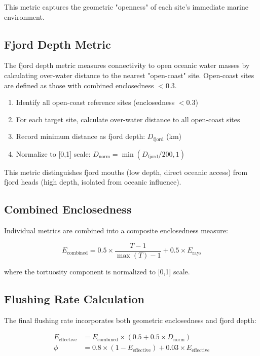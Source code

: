 \documentclass[11pt,a4paper]{article}
\begin{document}
This metric captures the geometric "openness" of each site's immediate marine environment.

\subsection{Fjord Depth Metric}

The fjord depth metric measures connectivity to open oceanic water masses by calculating over-water distance to the nearest "open-coast" site. Open-coast sites are defined as those with combined enclosedness $< 0.3$.

\begin{enumerate}
    \item Identify all open-coast reference sites (enclosedness $< 0.3$)
    \item For each target site, calculate over-water distance to all open-coast sites
    \item Record minimum distance as fjord depth: $D_{\text{fjord}}$ (km)
    \item Normalize to [0,1] scale: $D_{\text{norm}} = \min(D_{\text{fjord}}/200, 1)$
\end{enumerate}

This metric distinguishes fjord mouths (low depth, direct oceanic access) from fjord heads (high depth, isolated from oceanic influence).

\subsection{Combined Enclosedness}

Individual metrics are combined into a composite enclosedness measure:

\begin{equation}
E_{\text{combined}} = 0.5 \times \frac{T - 1}{\max(T) - 1} + 0.5 \times E_{\text{rays}}
\end{equation}

where the tortuosity component is normalized to [0,1] scale.

\subsection{Flushing Rate Calculation}

The final flushing rate incorporates both geometric enclosedness and fjord depth:

\begin{align}
E_{\text{effective}} &= E_{\text{combined}} \times (0.5 + 0.5 \times D_{\text{norm}}) \\
\phi &= 0.8 \times (1 - E_{\text{effective}}) + 0.03 \times E_{\text{effective}}
\end{align}
\end{document}
